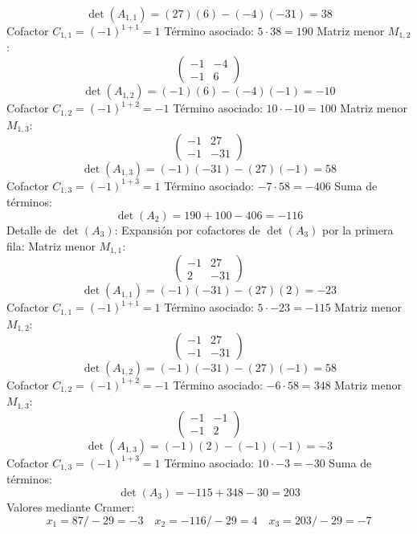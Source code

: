 \documentclass{article}
\begin{document}
\[\det(A_{1,1}) = (27)(6) - (-4)(-31) = 38\]
Cofactor $C_{1,1} = (-1)^{1+1} = 1$
Término asociado: $ 5 \cdot 38 = 190 $
Matriz menor $M_{1,2}$:
\[\begin{pmatrix}-1 & -4 \\ -1 & 6\end{pmatrix}\]
\[\det(A_{1,2}) = (-1)(6) - (-4)(-1) = -10\]
Cofactor $C_{1,2} = (-1)^{1+2} = -1$
Término asociado: $ 10 \cdot -10 = 100 $
Matriz menor $M_{1,3}$:
\[\begin{pmatrix}-1 & 27 \\ -1 & -31\end{pmatrix}\]
\[\det(A_{1,3}) = (-1)(-31) - (27)(-1) = 58\]
Cofactor $C_{1,3} = (-1)^{1+3} = 1$
Término asociado: $ -7 \cdot 58 = -406 $
Suma de términos:
\[\det(A_{2}) = 190 + 100 - 406 = -116\]
Detalle de $\det(A_{3})$:
Expansión por cofactores de $\det(A_{3})$ por la primera fila:
Matriz menor $M_{1,1}$:
\[\begin{pmatrix}-1 & 27 \\ 2 & -31\end{pmatrix}\]
\[\det(A_{1,1}) = (-1)(-31) - (27)(2) = -23\]
Cofactor $C_{1,1} = (-1)^{1+1} = 1$
Término asociado: $ 5 \cdot -23 = -115 $
Matriz menor $M_{1,2}$:
\[\begin{pmatrix}-1 & 27 \\ -1 & -31\end{pmatrix}\]
\[\det(A_{1,2}) = (-1)(-31) - (27)(-1) = 58\]
Cofactor $C_{1,2} = (-1)^{1+2} = -1$
Término asociado: $ -6 \cdot 58 = 348 $
Matriz menor $M_{1,3}$:
\[\begin{pmatrix}-1 & -1 \\ -1 & 2\end{pmatrix}\]
\[\det(A_{1,3}) = (-1)(2) - (-1)(-1) = -3\]
Cofactor $C_{1,3} = (-1)^{1+3} = 1$
Término asociado: $ 10 \cdot -3 = -30 $
Suma de términos:
\[\det(A_{3}) = -115 + 348 - 30 = 203\]
Valores mediante Cramer:
\[x_1 = 87/-29 = -3\quad x_2 = -116/-29 = 4\quad x_3 = 203/-29 = -7\]
\end{document}
